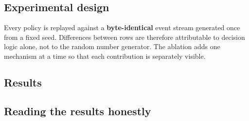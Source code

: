 \subsection{Experimental design}

\begin{keybox}


\medskip
Every policy is replayed against a \textbf{byte-identical} event stream
generated once from a fixed seed. Differences between rows are therefore
attributable to decision logic alone, not to the random number generator.
The ablation adds one mechanism at a time so that each contribution is
separately visible.
\end{keybox}

\subsection{Results}

\begin{center}\small\end{center}

\medskip
\begin{center}\small\end{center}

\subsection{Reading the results honestly}

